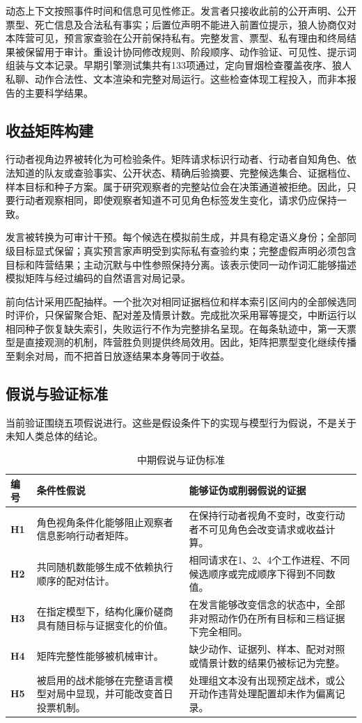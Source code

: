 \documentclass[UTF8,11pt,a4paper,fontset=windows]{ctexart}
\begin{document}
动态上下文按照事件时间和信息可见性修正。发言者只接收此前的公开声明、公开票型、死亡信息及合法私有事实；后置位声明不能进入前置位提示，狼人协商仅对本阵营可见，预言家查验在公开前保持私有。完整发言、票型、私有理由和终局结果被保留用于审计。重设计协同修改规则、阶段顺序、动作验证、可见性、提示词组装与文本记录。早期引擎测试集共有133项通过，定向冒烟检查覆盖夜序、狼人私聊、动作合法性、文本渲染和完整对局运行。这些检查体现工程投入，而非本报告的主要科学结果。

\subsection{收益矩阵构建}

行动者视角边界被转化为可检验条件。矩阵请求标识行动者、行动者自知角色、依法知道的队友或查验事实、公开状态、精确后验摘要、完整候选集合、证据档位、样本目标和种子方案。属于研究观察者的完整站位会在决策通道被拒绝。因此，只要行动者观察相同，即使观察者知道不可见角色标签发生变化，请求仍应保持一致。

发言被转换为可审计干预。每个候选在模拟前生成，并具有稳定语义身份；全部同级目标显式保留；真实预言家声明受到实际私有查验约束；完整虚假声明必须包含目标和阵营结果；主动沉默与中性参照保持分离。该表示使同一动作词汇能够描述模拟矩阵与经过编码的自然语言对局记录。

前向估计采用匹配抽样。一个批次对相同证据档位和样本索引区间内的全部候选同时评价，只保留聚合矩、配对差及情景计数。完成批次采用幂等提交，中断运行以相同种子恢复缺失索引，失败运行不作为完整排名呈现。在每条轨迹中，第一天票型是直接观测的机制，阵营胜负则提供终局效用。因此，矩阵把票型变化继续传播至剩余对局，而不把首日放逐结果本身等同于收益。

\subsection{假说与验证标准}

当前验证围绕五项假说进行。这些是假设条件下的实现与模型行为假说，不是关于未知人类总体的结论。

\begin{table}[htbp]
\centering
\caption{中期假说与证伪标准}
\begin{tabularx}{\textwidth}{>{\bfseries}p{}YY}
\toprule
编号 & 条件性假说 & 能够证伪或削弱假说的证据 \\
\midrule
H1 & 角色视角条件化能够阻止观察者信息影响行动者矩阵。 & 在保持行动者视角不变时，改变行动者不可见角色会改变请求或收益计算。 \\
H2 & 共同随机数能够生成不依赖执行顺序的配对估计。 & 相同请求在1、2、4个工作进程、不同候选顺序或完成顺序下得到不同数值。 \\
H3 & 在指定模型下，结构化廉价磋商具有随目标与证据变化的价值。 & 在发言能够改变信念的状态中，全部非对照动作仍在所有目标和三档证据下完全相同。 \\
H4 & 矩阵完整性能够被机械审计。 & 缺少动作、证据列、样本、配对对照或情景计数的结果仍被标记为完整。 \\
H5 & 被启用的战术能够在完整语言模型对局中显现，并可能改变首日投票机制。 & 处理组文本没有出现预定战术，或公开动作违背处理配置却未作为偏离记录。 \\
\bottomrule
\end{tabularx}
\end{table}
\end{document}
